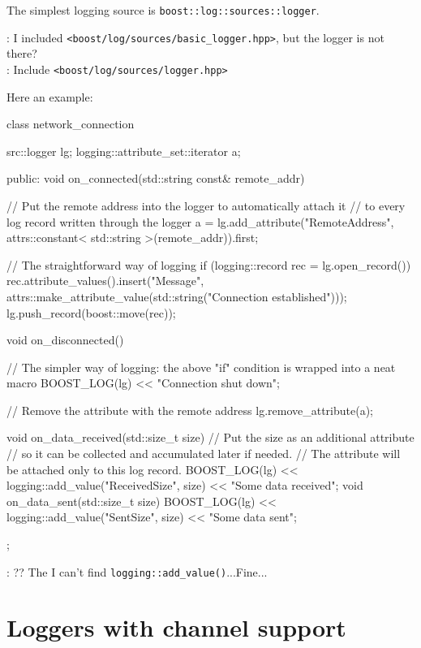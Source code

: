 \documentclass[dvipsnames]{article}
\begin{document}
The simplest logging source is \texttt{boost::log::sources::logger}.
\begin{tcolorbox}
   : I included \texttt{<boost/log/sources/basic\_logger.hpp>}, but
  the logger is not there?\\
   : Include \texttt{<boost/log/sources/logger.hpp>}
\end{tcolorbox}
Here an example:
\begin{simplec}
  class network_connection{
  src::logger lg;
  logging::attribute_set::iterator a;

public:
  void on_connected(std::string const& remote_addr){
    // Put the remote address into the logger to automatically attach it
    // to every log record written through the logger
    a = lg.add_attribute("RemoteAddress",
                                           attrs::constant< std::string >(remote_addr)).first;

    // The straightforward way of logging
    if (logging::record rec = lg.open_record()){
        rec.attribute_values().insert("Message",
                                      attrs::make_attribute_value(std::string("Connection established")));
        lg.push_record(boost::move(rec));
      }
  }
  void on_disconnected(){
    // The simpler way of logging: the above "if" condition is wrapped into a neat macro
    BOOST_LOG(lg) << "Connection shut down";

    // Remove the attribute with the remote address
    lg.remove_attribute(a);
  }
  void on_data_received(std::size_t size){
    // Put the size as an additional attribute
    // so it can be collected and accumulated later if needed.
    // The attribute will be attached only to this log record.
    BOOST_LOG(lg) << logging::add_value("ReceivedSize", size) << "Some data received";
  }
  void on_data_sent(std::size_t size){
    BOOST_LOG(lg) << logging::add_value("SentSize", size) << "Some data sent";
  }
};
\end{simplec}

 : ?? The I can't find \texttt{logging::add\_value()}...Fine...

\section{Loggers with channel support}
\end{document}

